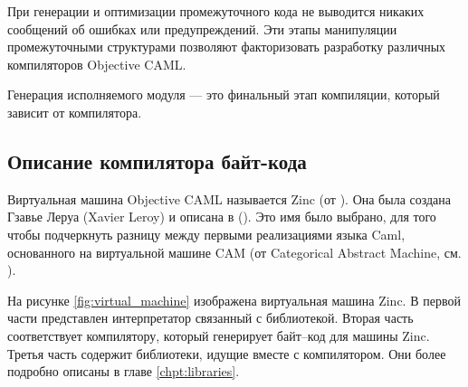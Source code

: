 При генерации и оптимизации промежуточного кода не выводится никаких сообщений
об ошибках или предупреждений. Эти этапы манипуляции промежуточными структурами
позволяют факторизовать разработку различных компиляторов Objective CAML.

Генерация исполняемого модуля --- это финальный этап компиляции, который зависит
от компилятора.

\subsection {Описание компилятора байт-кода}

Виртуальная машина Objective CAML называется Zinc (от ).
Она была создана Гзавье Леруа (Xavier Leroy) и описана в (\cite{??}). Это имя
было выбрано, для того чтобы подчеркнуть разницу между первыми реализациями
языка Caml, основанного на виртуальной машине CAM (от Categorical Abstract
Machine, см. \cite{??}).

На рисунке \ref{fig:virtual_machine} изображена виртуальная машина Zinc. В
первой части представлен интерпретатор связанный с библиотекой. Вторая часть
соответствует компилятору, который генерирует байт--код для машины Zinc. Третья
часть содержит библиотеки, идущие вместе с компилятором. Они более подробно
описаны в главе \ref{chpt:libraries}.

